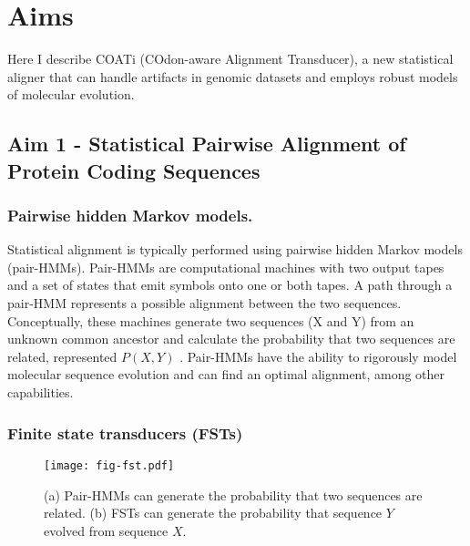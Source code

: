 \section{Aims}
Here I describe COATi (COdon-aware Alignment Transducer), a new statistical
aligner that can handle artifacts in genomic datasets and employs robust models
of molecular evolution.

\subsection{Aim 1 - Statistical Pairwise Alignment of Protein Coding Sequences}

\subsubsection{Pairwise hidden Markov models.}
Statistical alignment is typically performed using pairwise hidden Markov
models (pair-HMMs).
Pair-HMMs are computational machines with two output tapes and a set of states
that emit symbols onto one or both tapes.
A path through a pair-HMM represents a possible alignment between the two
sequences.
Conceptually, these machines generate two sequences (X and Y) from an unknown
common ancestor and calculate the probability that two sequences are related,
represented $P(X,Y)$ \parencite{yoon_2009_hmm}.
Pair-HMMs have the ability to rigorously model molecular sequence evolution and
can find an optimal alignment, among other capabilities.

\subsubsection{Finite state transducers (FSTs)}

\begin{wrapfigure}[16]{r}{0.35\textwidth}
\vspace{-2em}
\centering
\begin{framed}
    \texttt{[image: fig-fst.pdf]}
    \caption{(a) Pair-HMMs can generate the probability that two sequences are
             related. (b) FSTs can generate the probability that sequence $Y$
             evolved from sequence $X$.}
    \label{fig:fst}
\end{framed}
\end{wrapfigure}

